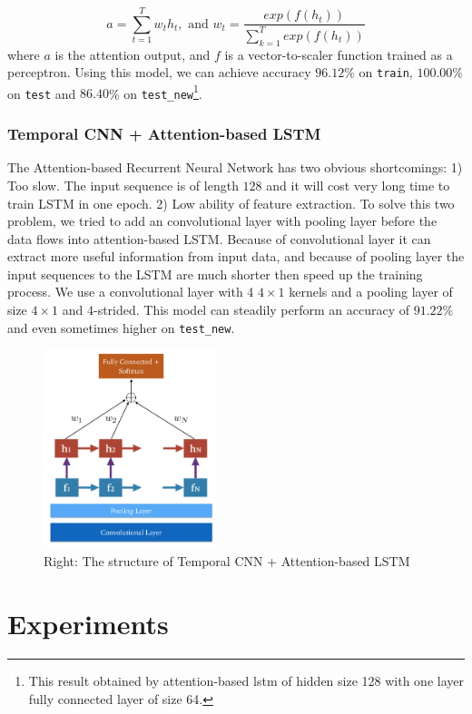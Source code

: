 \documentclass[a4paper]{article}
\begin{document}
\[ a = \sum_{t = 1}^{T} w_{t} h_t, \text{ and } w_{t} = \frac{exp(f(h_t))}{\sum_{k = 1}^{T}exp(f(h_t))}\]
where $a$ is the attention output, and $f$ is a vector-to-scaler function trained as a perceptron. Using this model, we can achieve accuracy $96.12\%$ on \texttt{train}, $100.00\%$ on  \texttt{test} and $86.40$\% on \texttt{test\_new}\footnote{This result obtained by attention-based lstm of hidden size 128 with one layer fully connected layer of size 64.}.

\subsubsection{Temporal CNN + Attention-based LSTM}
The Attention-based Recurrent Neural Network has two obvious shortcomings: 1) Too slow. The input sequence is of length $128$ and it will cost very long time to train LSTM in one epoch. 2) Low ability of feature extraction. To solve this two problem, we tried to add an convolutional layer with pooling layer before the data flows into attention-based LSTM. Because of convolutional layer it can extract more useful information from input data, and because of pooling layer the input sequences to the LSTM are much shorter then speed up the training process.
We use a convolutional layer with 4 $4\times 1$ kernels and a pooling layer of size $4 \times 1$ and $4$-strided. This model can steadily perform an accuracy of $91.22$\% and even sometimes higher on \texttt{test\_new}.

\begin{figure}[H]
	\centering
	\includegraphics[width = 0.45\textwidth]{figs/fig_cnnattenrnn}
	\caption{Right: The structure of Temporal CNN + Attention-based LSTM}
\end{figure}


\section{Experiments}
\end{document}
